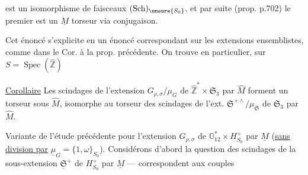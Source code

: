 

est un isomorphisme de faisceaux 
$(\mathrm{Sch})_{\unsure{S_0}}$, et par suite (prop. p.702)
le premier est un $\underline{M}$ torseur via conjugaison.

Cet énoncé s'explicite en un énoncé correspondant sur les extensions
ensemblistes, comme dans le Cor. à la prop. précédente.
On trouve en particulier, sur $S=\operatorname{Spec}(\widehat{\mathbb{Z}})$

\uline{Corollaire} Les scindages de l'extension
$G_{\rho,\sigma}/\mu_G$ de
$\widehat{\mathbb{Z}}^{*}\times\mathfrak{S}_3$ par $\widehat{M}$
forment un torseur sous $\widehat{M}$, isomorphe
 au torseur des scindages de l'ext.
$\mathfrak{S}^{+\wedge}/\mu_{\mathfrak{S}}$  de
$\mathfrak{S}_3$ par $\widehat{M}$.


Variante de l'étude précédente pour l'extension $G_{\rho,\sigma}$ de
$\mathbb O_{12}^{*}\times H_{S_0}^{+}$ par
$\underline{M}$ (\uline{sans division par}
$\underline{\mu}_G=\{1,\omega\}_{S_0}$). Considérons d'abord la question des
scindages de la sous-extension $\underline{\mathfrak{S}}^{+}$ de
$H_{S_0}^{+}$ par $\underline{M}$ --- 
correspondent aux couples

